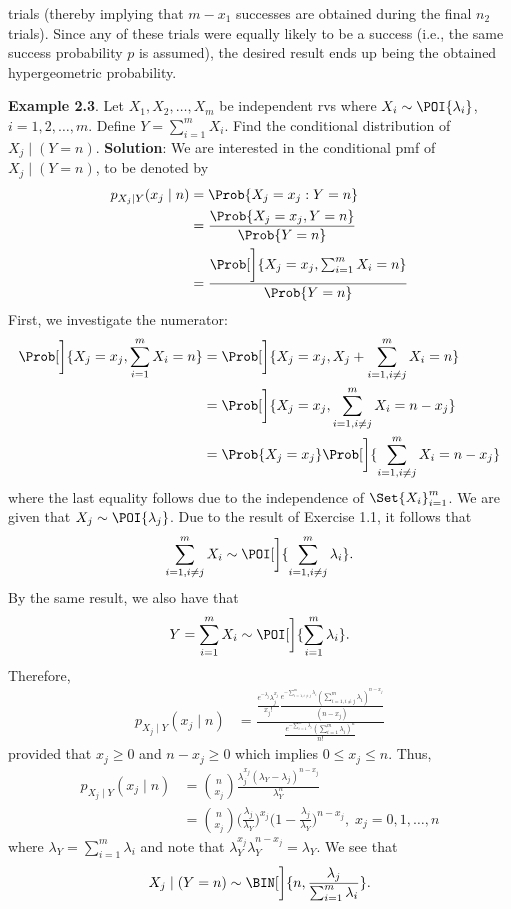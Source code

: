 trials (thereby implying that $ m-x_1 $ successes are obtained during the final $ n_2 $ trials). Since any of these trials were equally likely to be a success
(i.e., the same success probability $p$ is assumed), the desired result ends up being the obtained
hypergeometric probability.
\begin{Example}
    \textbf{Example 2.3}. Let $ X_1,X_2,\ldots,X_m $ be independent rvs where $ X_i \sim \POI{\lambda_i} $, $ i=1,2,\ldots,m $. Define
    $ Y=\sum_{i=1}^{m} X_i $. Find the conditional distribution of $ X_j\mid(Y=n) $.
    \tcblower{}
    \textbf{Solution}: We are interested in the conditional pmf of $ X_j\mid(Y=n) $, to be denoted by
    \begin{align*}
        p_{X_j\mid Y}(x_j\mid n)
         & =\Prob{X_j=x_j\given Y=n}                                      \\
         & =\frac{\Prob{X_j=x_j, Y=n}}{\Prob{Y=n}}                        \\
         & =\frac{\Prob[\bigg]{X_j=x_j,\sum_{i=1}^{m} X_i=n}}{\Prob{Y=n}}
    \end{align*}
    First, we investigate the numerator:
    \begin{align*}
        \Prob[\bigg]{X_j=x_j,\sum_{i=1}^{m} X_i=n}
         & =\Prob[\bigg]{X_j=x_j,X_j+\sum_{i=1,i\ne j}^m X_i=n}         \\
         & =\Prob[\bigg]{X_j=x_j,\sum_{i=1,i\ne j}^m X_i=n-x_j}         \\
         & =\Prob{X_j=x_j}\Prob[\bigg]{\sum_{i=1,i\ne j}^{m} X_i=n-x_j}
    \end{align*}
    where the last equality follows due to the independence of $ \Set{X_i}_{i=1}^m $. We are given that
    $ X_j \sim \POI{\lambda_j} $. Due to the result of Exercise 1.1, it follows that
    \[ \sum_{i=1,i\ne j}^{m} X_i \sim \POI[\bigg]{\sum_{i=1,i\ne j}^{m} \lambda_i}. \]
    By the same result, we also have that
    \[ Y=\sum_{i=1}^{m} X_i \sim \POI[\bigg]{\sum_{i=1}^{m} \lambda_i}. \]
    Therefore,
    \begin{align*}
        p_{X_j\mid Y}(x_j\mid n)
         & =\frac{\frac{e^{-\lambda_j}\lambda_j^{x_j}}{x_j!}\frac{e^{-\sum_{i=1,i\ne j}^{m} \lambda_i}(\sum_{i=1,i\ne j}^{m}\lambda_i)^{n-x_j}}{(n-x_j)}}{\frac{e^{-\sum_{i=1}^{m} \lambda_i}(\sum_{i=1}^{m} \lambda_i)^n}{n!}}
    \end{align*}
    provided that $ x_j\ge 0 $ and $ n-x_j\ge 0 $ which implies $ 0\le x_j\le n $. Thus,
    \begin{align*}
        p_{X_j\mid Y}(x_j\mid n)
         & =\binom{n}{x_j}\frac{\lambda_j^{x_j}(\lambda_Y-\lambda_j)^{n-x_j}}{\lambda_Y^n}                                                       \\
         & =\binom{n}{x_j}\biggl(\frac{\lambda_j}{\lambda_Y}\biggr)^{x_j}\biggl(1-\frac{\lambda_j}{\lambda_Y} \biggr)^{n-x_j},\;x_j=0,1,\ldots,n
    \end{align*}
    where $ \lambda_Y=\sum_{i=1}^{m} \lambda_i $ and note that $ \lambda_Y^{x_j}\lambda_Y^{n-x_j}=\lambda_Y $. We see that
    \[ X_j\mid (Y=n)\sim \BIN[\bigg]{n,\frac{\lambda_j}{\sum_{i=1}^{m} \lambda_i}}. \]
\end{Example}
